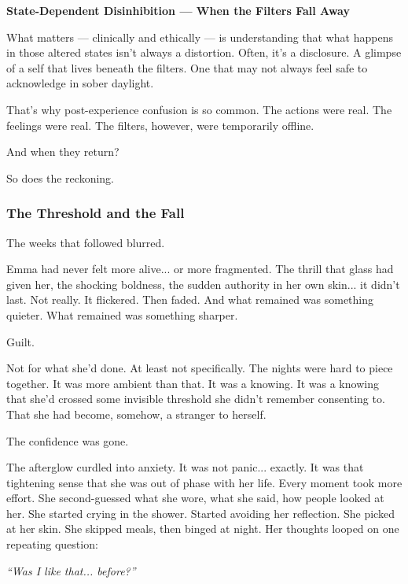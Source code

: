 \begin{TechnicalSidebar}{\textbf{State-Dependent Disinhibition — When the Filters Fall Away}}
  \medskip

  What matters — clinically and ethically — is understanding that what happens in those altered 
  states isn’t always a distortion. Often, it’s a disclosure. A glimpse of a self that lives beneath 
  the filters. One that may not always feel safe to acknowledge in sober daylight.

  \medskip
  
  That’s why post-experience confusion is so common. The actions were real. The feelings were real. 
  The filters, however, were temporarily offline.

  \medskip
  
  And when they return?

  \medskip
  
  So does the reckoning.
  
\end{TechnicalSidebar}

\subsubsection{The Threshold and the Fall}

The weeks that followed blurred.

Emma had never felt more alive... or more fragmented. The thrill that glass had given her, the shocking 
boldness, 
the sudden authority in her own skin... it didn’t last. Not really. It flickered. Then faded. And what 
remained was something quieter. What remained was something sharper.

Guilt.

Not for what she’d done. At least not specifically. The nights were hard to piece together. It was more 
ambient than that. It was a knowing. It was a knowing that she'd crossed some invisible threshold she didn’t 
remember consenting to. That she had become, somehow, a stranger to herself.

The confidence was gone.

The afterglow curdled into anxiety. It was not panic... exactly. It was that tightening sense that she was 
out of phase with her life. Every moment took more effort. She second-guessed what she wore, what she said, 
how people looked at her. She started crying in the shower. Started avoiding her reflection. She picked at her 
skin. She skipped meals, then binged at night. Her thoughts looped on one repeating question:

\textit{``Was I like that... before?''}

